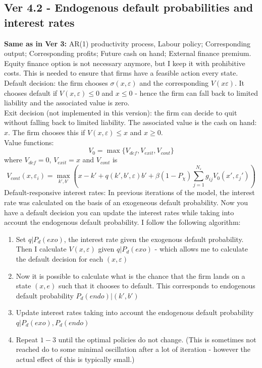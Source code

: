 \documentclass[12pt]{article}
\begin{document}
\subsection*{Ver 4.2 - Endogenous default probabilities and interest rates}
\textbf{Same as in Ver 3:} AR(1) productivity process, Labour policy; Corresponding output; Corresponding profits; Future cash on hand; External finance premium. \vspace{3mm} \\
Equity finance option is not necessary anymore, but I keep it with prohibitive costs. This is needed to ensure that firms have a feasible action every state.  \vspace{3mm} \\
Default decision: the firm chooses $\sigma(x, \varepsilon)$ and the corresponding $V(x \varepsilon)$. It chooses default if $V(x,\varepsilon) \leq 0$ and $x \leq 0$ - hence the firm can fall back to limited liability and the associated value is zero. \vspace{3mm} \\
Exit decision (not implemented in this version): the firm can decide to quit without falling back to limited liability. The associated value is the cash on hand: $x$. The firm chooses this if $V(x, \varepsilon) \leq x$ and $x \geq 0$. \vspace{3mm} \\
Value functions:
\begin{equation}
    V_0 = \max \{ V_{def}, V_{exit}, V_{cont} \}
\end{equation}
where $ V_{def} = 0$, $V_{exit} = x$ and $V_{cont}$ is
\begin{equation}
     V_{cont}(x, \varepsilon_i) = \max_{k',b'}  \left( x - k' +  q(k',b',\varepsilon) b' +
            \beta (1-P_\chi) \sum_{j=1}^{N_\varepsilon} g_{ij}  V_0(x',\varepsilon_j') \right)
\end{equation}
Default-responsive interest rates: In previous iterations of the model, the interest rate was calculated on the basis of an exogeneous default probability. Now you have a default decision you can update the interest rates while taking into account the endogenous default probability. I follow the following algorithm: 
\begin{enumerate}
    \item Set $q|P_{d}(exo)$, the interest rate given the exogenous default probability. Then I calculate $V(x,\varepsilon)$ given $q|P_{d}(exo)$ - which allows me to calculate the default decision for each $(x,\varepsilon)$
    \item Now it is possible to calculate what is the chance that the firm lands on a state $(x,e)$ such that it chooses to default. This corresponds to endogenous default probability $P_d(endo)|(k',b')$ 
    \item Update interest rates taking into account the endogenous default probability $q|P_{d}(exo),P_{d}(endo)$
    \item Repeat $1-3$ until the optimal policies do not change. (This is sometimes not reached do to some minimal oscillation after a lot of iteration - however the actual effect of this is typically small.)
\end{enumerate}
\end{document}
